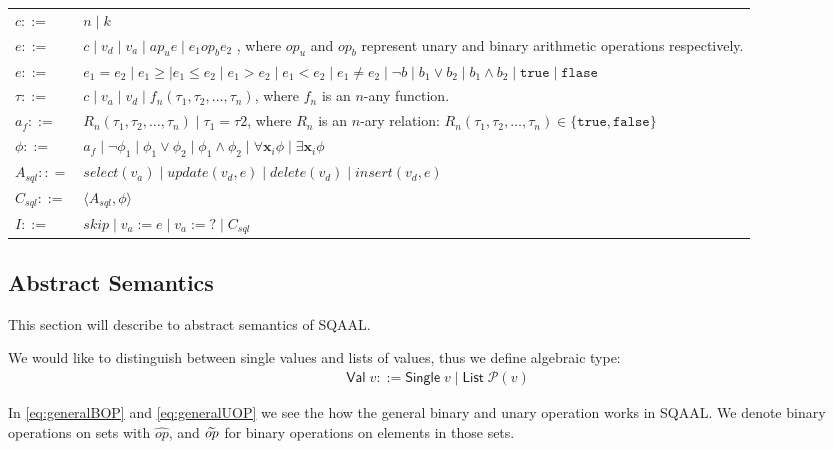 \begin{center}
    \begin{tabular}{l l}
        $c ::=$ & $n \mid k$ \\
        $e ::=$ & $c \mid v_d \mid v_a \mid ap_u e \mid e_1 op_b e_2$ , where $op_u$ and $op_b$ represent unary and binary arithmetic operations respectively. \\
        $e ::=$ & $e_1 = e_2 \mid e_1 \geq \mid e_1 \leq e_2 \mid e_1 > e_2 \mid e_1 < e_2 \mid e_1 \neq e_2 \mid \neg b \mid b_1 \lor b_2 \mid b_1 \land b_2 \mid \texttt{true} \mid \texttt{flase}$ \\
        $\tau ::=$ & $c \mid v_a \mid v_d \mid f_n(\tau_1, \tau_2, \dots, \tau_n)$, where $f_n$ is an $n$-any function. \\
        $a_f ::=$ & $R_n(\tau_1, \tau_2, \dots, \tau_n) \mid \tau_1 = \tau2$, where $R_n$ is an $n$-ary relation: $R_n(\tau_1, \tau_2, \dots, \tau_n) \in \{ \texttt{true}, \texttt{false}\}$ \\
        $\phi ::=$ & $a_f \mid \neg \phi_1 \mid \phi_1 \lor \phi_2 \mid \phi_1 \land \phi_2 \mid \forall \textbf{x}_i \phi \mid \exists \textbf{x}_i \phi$ \\
        $A_{sql} :: =$ & $select(v_a) \mid update(v_d, e) \mid delete(v_d) \mid insert(v_d, e)$ \\
        $C_{sql} ::=$ & $\langle A_{sql}, \phi \rangle $ \\
        $I ::=$ & $skip \mid v_a := e \mid v_a := ? \mid C_{sql} $\\
    \end{tabular}
\end{center}


\subsection{Abstract Semantics}\label{subsec:abstract-semantics}
This section will describe to abstract semantics of SQAAL.

We would like to distinguish between single values and lists of values, thus we define algebraic type:
\begin{align}
    \mathsf{Val} \; v ::= \mathsf{Single} \; v \mid \mathsf{List} \; \mathcal{P}(v)
\end{align}

In \autoref{eq:generalBOP} and \autoref{eq:generalUOP} we see the how the general binary and unary operation works in SQAAL.
We denote binary operations on sets with $\widehat{op}$, and $\widetilde{op}$ for binary operations on elements in those sets.

